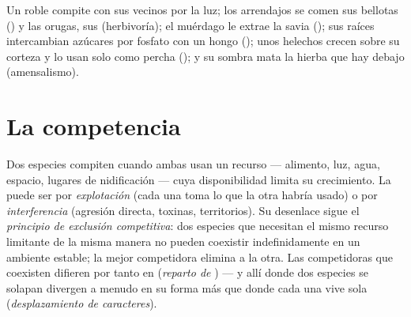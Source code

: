 \begin{example}\label{ex:b1:species-interactions:oak}
Un roble compite con sus vecinos por la luz; los arrendajos se comen sus
bellotas () y las orugas, sus  (herbivoría); el muérdago le
extrae la savia (); sus raíces intercambian azúcares por fosfato
con un hongo (); unos helechos crecen sobre su corteza y lo usan
solo como percha (); y su sombra mata la hierba que hay debajo
(amensalismo).
\end{example}

\section{La competencia}

\begin{definition}\label{def:b1:species-interactions:competition}
Dos especies compiten cuando ambas usan un recurso --- alimento, luz, agua,
espacio, lugares de nidificación --- cuya disponibilidad limita su
crecimiento. La  puede ser por \emph{explotación} (cada una toma
lo que la otra habría usado) o por \emph{interferencia} (agresión directa,
toxinas, territorios). Su desenlace sigue el \emph{principio de exclusión
competitiva}: dos especies que necesitan el mismo recurso limitante de la
misma manera no pueden coexistir indefinidamente en un ambiente estable; la
mejor competidora elimina a la otra. Las competidoras que coexisten difieren
por tanto en  (\emph{reparto de }) --- y allí donde dos especies
se solapan divergen a menudo en su forma más que donde cada una vive sola
(\emph{desplazamiento de caracteres}).
\end{definition}

